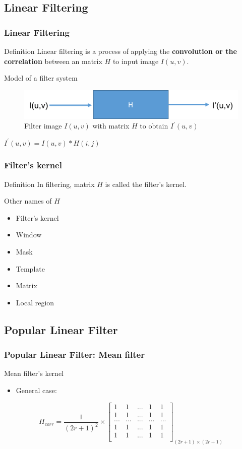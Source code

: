 \documentclass[english,11pt,table,handout]{beamer}
\begin{document}
\subsection{Linear Filtering}
\frame
{
	\frametitle{Linear Filtering}
	\begin{block}{Definition}
		Linear filtering is a process of applying the \alert{\textbf{convolution or the correlation}} between an matrix $H$ to input image $I(u,v)$.
	\end{block}
	\begin{block}{Model of a filter system}
		\begin{figure}[!h]
			\includegraphics[scale=0.57]{filtersys.png}
			\caption{Filter image $I(u,v)$ with matrix $H$ to obtain $I^{'}(u,v)$} 
		\end{figure}
		
		\centering
		$I^{'}(u,v) =  I(u,v)*H(i,j)$
	\end{block}
}
\frame
{
	\frametitle{Filter's kernel}
	\begin{block}{Definition}
		In filtering, matrix $H$ is called the filter's kernel.
	\end{block}
	\begin{block}{Other names of $H$}
		\begin{itemize}
			\item Filter's kernel
			\item Window
			\item Mask
			\item Template
			\item Matrix
			\item Local region
		\end{itemize}
	\end{block}
}
\subsection{Popular Linear Filter}
\frame
{
	\frametitle{Popular Linear Filter: Mean filter}
	\begin{example}
		Mean filter's kernel
		\begin{itemize}
			\item General case:
		\end{itemize}
		$$
		H_{corr} = \frac{1}{(2r+1)^2} \times 
		\begin{bmatrix}
		1 & 1 & ... & 1 & 1 \\
		1 & 1 & ... & 1 & 1 \\
		... & ... & ... & ... & ... \\
		1 & 1 & ... & 1 & 1 \\
		1 & 1 & ... & 1 & 1 \\
		\end{bmatrix}_{(2r+1) \times (2r+1)}
		$$
	\end{example}
}
\end{document}
